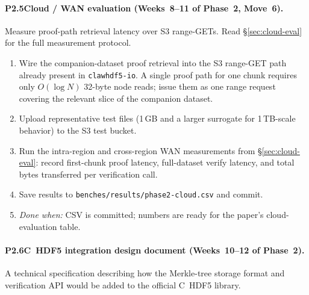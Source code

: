 \documentclass[11pt]{article}
\begin{document}
\paragraph{P2.5\enspace Cloud / WAN evaluation
(Weeks~8--11 of Phase~2, \textbf{Move~6}).}
Measure proof-path retrieval latency over S3 range-GETs. Read
\S\ref{sec:cloud-eval} for the full measurement protocol.

\begin{enumerate}[nosep]
  \item Wire the companion-dataset proof retrieval into the S3 range-GET
    path already present in \texttt{clawhdf5-io}. A single proof path for
    one chunk requires only $O(\log N)$ 32-byte node reads; issue them as
    one range request covering the relevant slice of the companion dataset.
  \item Upload representative test files (1\,GB and a larger surrogate for
    1\,TB-scale behavior) to the S3 test bucket.
  \item Run the intra-region and cross-region WAN measurements from
    \S\ref{sec:cloud-eval}: record first-chunk proof latency, full-dataset
    verify latency, and total bytes transferred per verification call.
  \item Save results to \texttt{benches/results/phase2-cloud.csv} and commit.
  \item \emph{Done when:} CSV is committed; numbers are ready for the
    paper's cloud-evaluation table.
\end{enumerate}

\paragraph{P2.6\enspace C~HDF5 integration design document
(Weeks~10--12 of Phase~2).}
A technical specification describing how the Merkle-tree storage format
and verification API would be added to the official C~HDF5 library.
\end{document}
